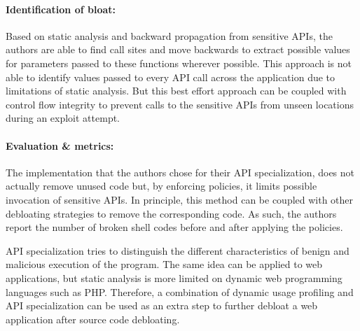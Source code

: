 \paragraph{Identification of bloat:} Based on static analysis and backward propagation from sensitive APIs, the authors are able to find call sites and move backwards to extract possible values for parameters passed to these functions wherever possible. This approach is not able to identify values passed to every API call across the application due to limitations of static analysis. But this best effort approach can be coupled with control flow integrity to prevent calls to the sensitive APIs from unseen locations during an exploit attempt.
\paragraph{Evaluation \& metrics:} The implementation that the authors chose for their API specialization, does not actually remove unused code but, by enforcing policies, it limits possible invocation of sensitive APIs. In principle, this method can be coupled with other debloating strategies to remove the corresponding code. As such, the authors report the number of broken shell codes before and after applying the policies.

API specialization tries to distinguish the different characteristics of benign and malicious execution of the program. The same idea can be applied to web applications, but static analysis is more limited on dynamic web programming languages such as PHP. Therefore, a combination of dynamic usage profiling and API specialization can be used as an extra step to further debloat a web application after source code debloating.
